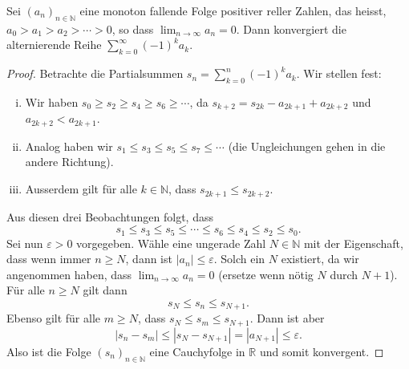 \documentclass[../main.tex]{subfiles}
\begin{document}
\begin{leibniz}
  Sei ${(a_{n})}_{n \in \mathbb{N}}$ eine monoton fallende Folge
  positiver reller Zahlen, das heisst,
  \(
   a_0 > a_1 > a_2 > \cdots > 0
  \),
  so dass
  \(
    \lim_{n \to \infty}a_n = 0.
  \)
  Dann konvergiert die alternierende Reihe
  \(
    \sum_{k=0}^{\infty} {(-1)}^k a_k.
  \)
\end{leibniz}

\begin{proof}
  Betrachte die Partialsummen $s_n = \sum_{k=0}^{n} {(-1)}^k a_k$.
  Wir stellen fest:
  \begin{enumerate}[(i)]
    \item Wir haben $s_0 \geq s_2 \geq s_4 \geq s_6 \geq \cdots$,
      da $s_{k+2} = s_{2k} - a_{2k+1} + a_{2k+2}$ und
      $a_{2k+2}<a_{2k+1}$.
    \item Analog haben wir 
      $s_1 \leq s_3 \leq s_5 \leq s_7 \leq \cdots$ (die
      Ungleichungen gehen in die andere Richtung).
    \item Ausserdem gilt für alle $k \in \mathbb{N}$, dass
      $s_{2k+1} \leq s_{2k+2}$.
  \end{enumerate}
  Aus diesen drei Beobachtungen folgt, dass
  \[
    s_1 \leq s_3 \leq s_5 \leq \cdots \leq s_6 \leq s_4 \leq
    s_2 \leq s_0.
  \]
  Sei nun $\varepsilon > 0$ vorgegeben. Wähle 
  eine ungerade Zahl $N \in \mathbb{N}$ 
  mit der Eigenschaft, dass wenn immer $n \geq N$, dann
  ist $|a_n| \leq \varepsilon$. Solch ein $N$ existiert,
  da wir angenommen haben, dass
  \(
    \lim_{n \to \infty} a_n = 0
  \)
  (ersetze wenn nötig $N$ durch $N + 1$).
  Für alle $n \geq N$ gilt dann
  \[
    s_N \leq s_n \leq s_{N+1}.
  \]
  Ebenso gilt für alle $m \geq N$, dass
  $s_N \leq s_m \leq s_{N+1}$. Dann ist aber
  \[
    |s_n - s_m| \leq |s_N - s_{N+1}| = |a_{N+1}| \leq \varepsilon.
  \]
  Also ist die Folge ${(s_{n})}_{n \in \mathbb{N}}$
  eine Cauchyfolge in $\mathbb{R}$ und somit konvergent.
\end{proof}
\end{document}

